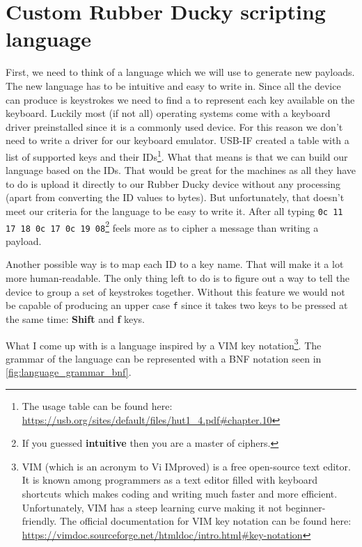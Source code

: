 \section{Custom Rubber Ducky scripting language}
\label{customLanguage}
First, we need to think of a language which we will use to generate new payloads. The new language has to be intuitive and easy to write in. Since all the device can produce is keystrokes we need to find a to represent each key available on the keyboard. Luckily most (if not all) operating systems come with a keyboard driver preinstalled since it is a commonly used device. For this reason we don't need to write a driver for our keyboard emulator. \mbox{USB-IF} created a table with a list of supported keys and their IDs\footnote{The usage table can be found here: \url{https://usb.org/sites/default/files/hut1_4.pdf\#chapter.10}}. What that means is that we can build our language based on the IDs. That would be great for the machines as all they have to do is upload it directly to our Rubber Ducky device without any processing (apart from converting the ID values to bytes). But unfortunately, that doesn't meet our criteria for the language to be easy to write it. After all typing \verb|0c 11 17 18 0c 17 0c 19 08|\footnote{If you guessed \textbf{intuitive} then you are a master of ciphers.} feels more as to cipher a message than writing a payload.

Another possible way is to map each ID to a key name. That will make it a lot more human-readable. The only thing left to do is to figure out a way to tell the device to group a set of keystrokes together. Without this feature we would not be capable of producing an upper case \verb|f| since it takes two keys to be pressed at the same time: \textbf{Shift} and \textbf{f} keys.

What I come up with is a language inspired by a VIM key notation\footnote{VIM (which is an acronym to Vi IMproved) is a free open-source text editor. It is known among programmers as a text editor filled with keyboard shortcuts which makes coding and writing much faster and more efficient. Unfortunately, VIM has a steep learning curve making it not beginner-friendly. The official documentation for VIM key notation can be found here: \url{https://vimdoc.sourceforge.net/htmldoc/intro.html\#key-notation}}. The grammar of the language can be represented with a BNF notation seen in \autoref{fig:language_grammar_bnf}.


